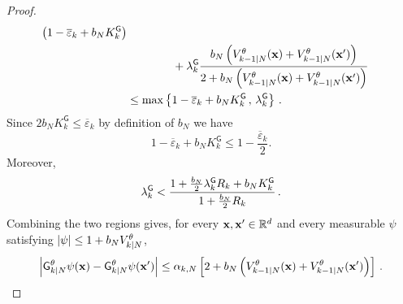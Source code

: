 \documentclass[11pt]{article}
\theoremstyle{plain}
\theoremstyle{definition}
\theoremstyle{remark}
\begin{document}
\begin{proof}
\begin{align*}
\left(1-\overline\varepsilon_k+b_NK_k^{\mathsf G}\right) \\
& \qquad \qquad + \lambda_k^{\mathsf G} \frac{b_N \left( \twistedlyap{k-1}{N}[\theta](\x) +  \twistedlyap{k-1}{N}[\theta](\x') \right)  }{
2+b_N \left( \twistedlyap{k-1}{N}[\theta](\x)  + \twistedlyap{k-1}{N}[\theta](\x') \right) } 
\\
& \le \max\left\{ 1-\overline\varepsilon_k + b_N K_k^{\mathsf G} \eqsp, \eqsp \lambda_k^{\mathsf G} \right\} \eqsp.
\end{align*}
Since $2b_N K_k^{\mathsf G} \le \overline\varepsilon_k$ by definition of $b_N$ we have
$$
1-\overline\varepsilon_k+b_NK_k^{\mathsf G} \le 1-\frac{\overline\varepsilon_k}{2}.
$$
Moreover,
$$
\lambda_k^{\mathsf G} < \frac{ 1+\frac{b_N}{2}\lambda_k^{\mathsf G}R_k + b_N K_k^{\mathsf G} }{ 1+\frac{b_N}{2}R_k }
\,.
$$
Combining the two regions gives, for every $\mathbf{x},\mathbf{x}'\in\mathbb{R}^d$ and every measurable $\psi$ satisfying
$|\psi|\le1+b_N\twistedlyap{k}{N}[\theta]$,
\begin{equation}
\label{eq:pointwise_adapted_contraction}
\left| \fsmk{k}{N}[\theta]\psi(\x) - \fsmk{k}{N}[\theta]\psi(\x') \right|
\le \alpha_{k,N} \left[ 2+ b_N \left( \twistedlyap{k-1}{N}[\theta](\x) + \twistedlyap{k-1}{N}[\theta](\x') \right) \right] \eqsp.
\end{equation}


\end{proof}
\end{document}

